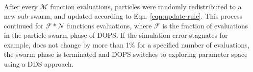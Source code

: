 \documentclass[12pt]{article}
\begin{document}
\begin{eqnarray*}
\end{eqnarray*}

\begin{algorithm}
\end{algorithm}

After every $\mathcal{M}$ function evaluations, particles were randomly redistributed to a new sub-swarm, and updated according to Eqn. \eqref{eqn:update-rule}.
This process continued for $\mathcal{F}*\mathcal{N}$ functions evaluations, where $\mathcal{F}$ is the fraction of evaluations in the particle swarm phase of DOPS.
If the simulation error stagnates for example, does not change by more than 1\% for a specified number of evaluations, the swarm phase is terminated and DOPS switches to
exploring parameter space using a DDS approach.
\end{document}
